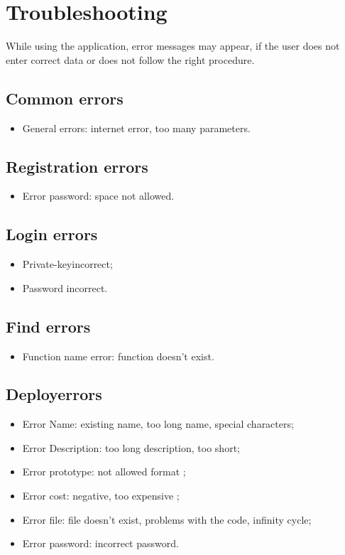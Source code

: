 \section{Troubleshooting}
While using the application, error messages may appear, if the user does not enter correct data or does not follow the right procedure. 
\subsection{Common errors}
\begin{itemize}
	\item General errors: internet error, too many parameters.
\end{itemize}
\subsection{Registration errors}
\begin{itemize}
	\item Error password: space not allowed.
\end{itemize}
\subsection{Login errors}
\begin{itemize}
	\item Private-key\glo incorrect;
	\item Password incorrect.
\end{itemize}
\subsection{Find errors}
\begin{itemize}
	\item Function name error: function doesn't exist.
\end{itemize}
\subsection{Deploy\glo errors}
\begin{itemize}
	\item Error Name: existing name, too long name, special characters;
	\item Error Description: too long description, too short;
	\item Error prototype: not allowed format ;
	\item Error cost: negative, too expensive ;
	\item Error file: file doesn't exist, problems with the code, infinity cycle;
	\item Error password: incorrect password.
\end{itemize}
